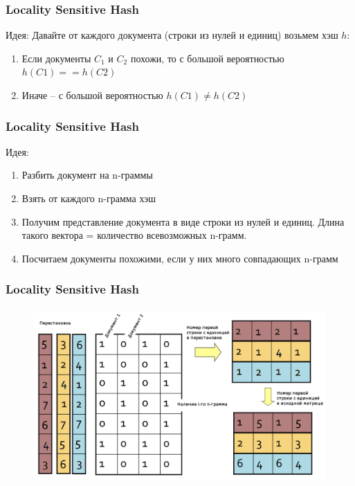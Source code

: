 \documentclass[10pt]{beamer}
\begin{document}
\begin{frame}\frametitle{Locality Sensitive Hash}
	\alert{Идея}: Давайте от каждого документа (строки из нулей и единиц) возьмем хэш $h$:\\
	\begin{enumerate} [--]
	\item Если документы $C_1$ и $C_2$ похожи, то с большой вероятностью $h(C1) == h(C2)$\\
	\item Иначе -- с большой вероятностью $h(C1) \neq h(C2)$
	\end{enumerate}
\end{frame}

\begin{frame}\frametitle{Locality Sensitive Hash}
	\alert{Идея}: \\
	\begin{enumerate}
	\item Разбить документ на n-граммы
	\item Взять от каждого n-грамма хэш
	\item Получим представление документа в виде строки из нулей и единиц. Длина такого вектора = количество всевозможных n-грамм.
	\item Посчитаем документы похожими, если у них много совпадающих n-грамм
	\end{enumerate}
\end{frame}

\begin{frame}\frametitle{Locality Sensitive Hash}
	\begin{figure}[htbp]
	\centering
	\includegraphics[height=190pt]{images/min-hash1}  
	\end{figure}
\end{frame}

	
\end{document}
